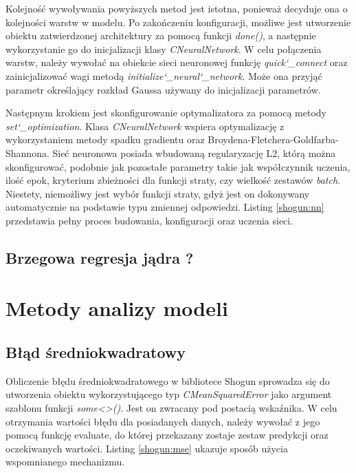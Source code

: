 Kolejność wywoływania powyższych metod jest istotna, ponieważ decyduje ona o kolejności warstw w modelu. Po zakończeniu konfiguracji, możliwe jest utworzenie obiektu zatwierdzonej architektury za pomocą funkcji \textit{done()}, a następnie wykorzystanie go do inicjalizacji klasy \textit{CNeuralNetwork}. W celu połączenia warstw, należy wywołać na obiekcie sieci neuronowej funkcję \textit{quick\char`_connect} oraz zainicjalizować wagi metodą \textit{initialize\char`_neural\char`_network}. Może ona przyjąć parametr określający rozkład Gaussa używany do inicjalizacji parametrów.

Następnym krokiem jest skonfigurowanie optymalizatora za pomocą metody \textit{set\char`_optimization}. Klasa \textit{CNeuralNetwork} wspiera optymalizację z wykorzystaniem metody spadku gradientu oraz Broydena-Fletchera-Goldfarba-Shannona. Sieć neuronowa posiada wbudowaną regularyzację L2, którą można skonfigurować, podobnie jak pozostałe parametry takie jak współczynnik uczenia, ilość epok, kryterium zbieżności dla funkcji straty, czy wielkość zestawów \textit{batch}. Niestety, niemożliwy jest wybór funkcji straty, gdyż jest on dokonywany automatycznie na podstawie typu zmiennej odpowiedzi. Listing \ref{shogun:nn} przedstawia pełny proces budowania, konfiguracji oraz uczenia sieci.


\subsection{Brzegowa regresja jądra ?}

\section{Metody analizy modeli}

\subsection{Błąd średniokwadratowy}

Obliczenie błędu średniokwadratowego w bibliotece Shogun sprowadza się do utworzenia obiektu wykorzystującego typ \textit{CMeanSquaredError} jako argument szablonu funkcji \textit{some<>()}. Jest on zwracany pod postacią wskaźnika. W celu otrzymania wartości błędu dla posiadanych danych, należy wywołać z jego pomocą funkcję evaluate, do której przekazany zostaje zestaw predykcji oraz oczekiwanych wartości. Listing \ref{shogun:mse} ukazuje sposób użycia wspomnianego mechanizmu.

